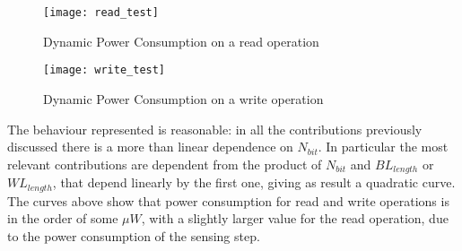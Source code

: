 \begin{minipage}{\linewidth}
	\centering
	\begin{minipage}{0.4\linewidth}
	\begin{figure}[H]
		\begin{center}
			\texttt{[image: read\_test]}
		\end{center}
		\caption{Dynamic Power Consumption on a read operation} 
		\label{read_power}
	\end{figure}
	\end{minipage}
	\hspace{0.05\linewidth}
	\begin{minipage}{0.45\linewidth}
	\begin{figure}[H]
		\begin{center}
			\texttt{[image: write\_test]}
		\end{center}
		\caption{Dynamic Power Consumption on a write operation}
		\label{write_power}
	\end{figure}
	\end{minipage}
\end{minipage}
\vspace{0.5cm}

The behaviour represented is reasonable: in all the contributions previously discussed there is a more than linear dependence on $N_{bit}$. In particular the most relevant contributions are dependent from the product of $N_{bit}$ and $BL_{length}$ or $WL_{length}$, that depend linearly by the first one, giving as result a quadratic curve.\\
The curves above show that power consumption for read and write operations is in the order of some $\mu W$, with a slightly larger value for the read  operation, due to the power consumption of the sensing step.\\